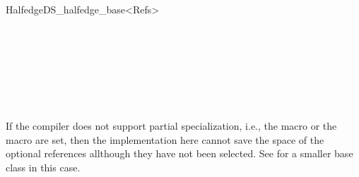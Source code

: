 \begin{ccRefClass}{HalfedgeDS_halfedge_base<Refs>}
\ccSeeAlso

\\
\\
\\
\\
\\
\\

\ccImplementation

If the compiler does not support partial specialization, i.e., the
macro  or the
macro  are set, then the
implementation here cannot save the space of the optional references
allthough they have not been selected. See
 for a smaller base class in this
case.

\end{ccRefClass}

\ccRefPageEnd

